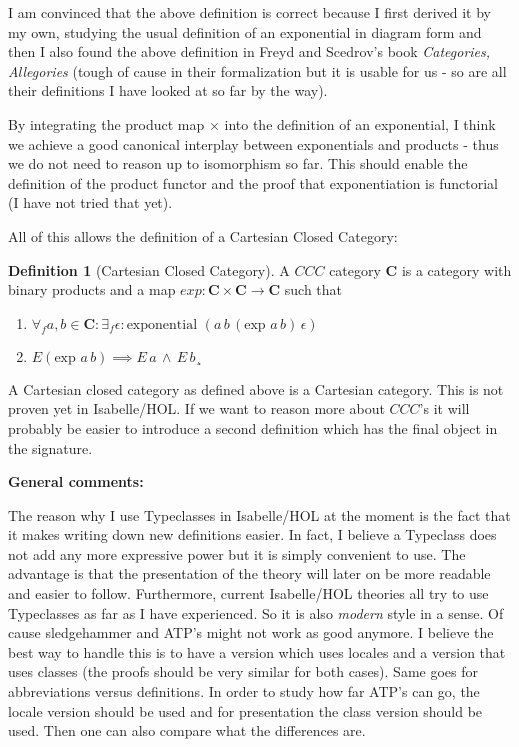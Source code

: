 \documentclass[a4paper, 11pt]{article}
\theoremstyle{definition}
\newtheorem{definition}[theorem]{Definition}
\newcommand{\cat}{%
	\mathbf %
}
\newcommand{\notion}[1]{\text{#1 }}
\newcommand{\expon}[4]{\notion{exponential} (#1 \, #2 \, #3 \, #4)}
\begin{document}
I am convinced that the above definition is correct because I first derived it by my own, studying the usual definition of an exponential in diagram form and then I also found the above definition in Freyd and Scedrov's book \textit{Categories, Allegories} (tough of cause in their formalization but it is usable for us - so are all their definitions I have looked at so far by the way).

By integrating the product map $\times$ into the definition of an exponential, I think we achieve a good canonical interplay between exponentials and products - thus we do not need to reason up to isomorphism so far. This should enable the definition of the product functor and the proof that exponentiation is functorial (I have not tried that yet).

All of this allows the definition of a Cartesian Closed Category:

\begin{definition}[Cartesian Closed Category]
	A $CCC$ category $\cat C$ is a category with binary products and a map $exp : \cat C \times \cat C \to \cat C$ such that 
	\begin{enumerate}
		\item $\forall_f a,b \in \cat C: \exists_f \epsilon: \expon{a}{b}{(\notion{exp} a \, b)}{\epsilon}$
		\item $E (\notion{exp} a \, b) \implies E \, a \, \wedge \, E \, b¸$
	\end{enumerate}
\end{definition}

A Cartesian closed category as defined above is a Cartesian category. This is not proven yet in Isabelle/HOL. If we want to reason more about $CCC$'s it will probably be easier to introduce a second definition which has the final object in the signature.

\medskip

\noindent \textbf{General comments: } 

The reason why I use Typeclasses in Isabelle/HOL at the moment is the fact that it makes writing down new definitions easier. In fact, I believe a Typeclass does not add any more expressive power but it is simply convenient to use. The advantage is that the presentation of the theory will later on be more readable and easier to follow. Furthermore, current Isabelle/HOL theories all try to use Typeclasses as far as I have experienced. So it is also \textit{modern} style in a sense.
Of cause sledgehammer and ATP's might not work as good anymore. I believe the best way to handle this is to have a version which uses locales and a version that uses classes (the proofs should be very similar for both cases). Same goes for abbreviations versus definitions. In order to study how far ATP's can go, the locale version should be used and for presentation the class version should be used. Then one can also compare what the differences are.
\end{document}
